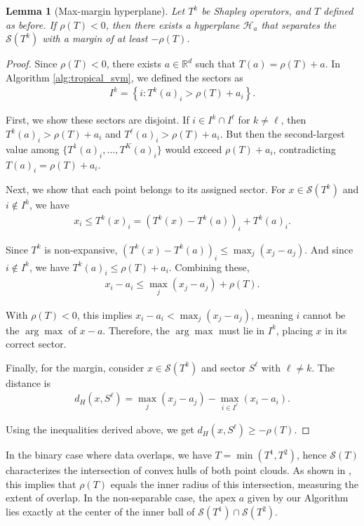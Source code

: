 \documentclass{article}
\newtheorem{lemma}[theorem]{Lemma}
\newcommand{\R}{\mathbb{R}}
\begin{document}
\begin{lemma}[Max-margin hyperplane]\label{lemma:operator_to_hyperplane}
Let $T^k$ be Shapley operators, and $T$ defined as before. If $\rho(T) < 0$, then there exists a hyperplane $\mathcal{H}_a$ that separates the $\mathcal{S}(T^k)$ with a margin of at least $-\rho(T)$.
\end{lemma}

\begin{proof}
Since $\rho(T) < 0$, there exists $a \in \R^d$ such that $T(a) = \rho(T) + a$. In Algorithm \ref{alg:tropical_svm}, we defined the sectors as
\begin{align}
I^k = \left\{i : T^k(a)_i > \rho(T) + a_i\right\}.
\end{align}

First, we show these sectors are disjoint. If $i \in I^k \cap I^{\ell}$ for $k \neq \ell$, then $T^k(a)_i > \rho(T) + a_i$ and $T^{\ell}(a)_i > \rho(T) + a_i$. But then the second-largest value among $\{T^1(a)_i,\ldots,T^K(a)_i\}$ would exceed $\rho(T) + a_i$, contradicting $T(a)_i = \rho(T) + a_i$.

Next, we show that each point belongs to its assigned sector. For $x \in \mathcal{S}(T^k)$ and $i \not\in I^k$, we have
\begin{align}
x_i \leq T^k(x)_i = (T^k(x) - T^k(a))_i + T^k(a)_i.
\end{align}

Since $T^k$ is non-expansive, $(T^k(x) - T^k(a))_i \leq \max_j(x_j - a_j)$. And since $i \not\in I^k$, we have $T^k(a)_i \leq \rho(T) + a_i$. Combining these,
\begin{align}
x_i - a_i \leq \max_j(x_j - a_j) + \rho(T).
\end{align}

With $\rho(T) < 0$, this implies $x_i - a_i < \max_j(x_j - a_j)$, meaning $i$ cannot be the $\arg\max$ of $x - a$. Therefore, the $\arg\max$ must lie in $I^k$, placing $x$ in its correct sector.

Finally, for the margin, consider $x \in \mathcal{S}(T^k)$ and sector $S^{\ell}$ with $\ell \neq k$. The distance is
\begin{align}
d_H(x, S^{\ell}) = \max_j(x_j - a_j) - \max_{i \in I^{\ell}}(x_i - a_i).
\end{align}

Using the inequalities derived above, we get $d_H(x, S^{\ell}) \geq -\rho(T)$.
\end{proof}

In the binary case where data overlaps, we have $T = \min(T^1, T^2)$, hence $\mathcal{S}(T)$ characterizes the intersection of convex hulls of both point clouds. As shown in \cite{akian2020}, this implies that $\rho(T)$ equals the inner radius of this intersection, measuring the extent of overlap. In the non-separable case, the apex $a$ given by our Algorithm lies exactly at the center of the inner ball of $\mathcal{S}(T^1) \cap \mathcal{S}(T^2)$.
\end{document}
